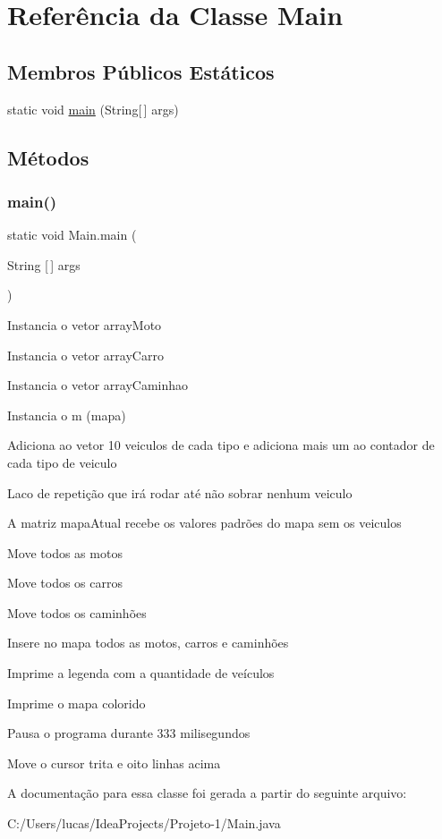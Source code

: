 \hypertarget{class_main}{}\section{Referência da Classe Main}
\label{class_main}
\subsection*{Membros Públicos Estáticos}
\begin{DoxyCompactItemize}
\item 
static void \mbox{\hyperlink{class_main_a8a5d0f827edddff706cc0e6740d0579a}{main}} (String\mbox{[}$\,$\mbox{]} args)
\end{DoxyCompactItemize}


\subsection{Métodos}
\mbox{\label{class_main_a8a5d0f827edddff706cc0e6740d0579a}} 
\subsubsection{\texorpdfstring{main()}{main()}}
{\footnotesize\ttfamily static void Main.\+main (\begin{DoxyParamCaption}\item[{String \mbox{[}$\,$\mbox{]}}]{args }\end{DoxyParamCaption})\hspace{0.3cm}{\ttfamily [static]}}

Instancia o vetor array\+Moto

Instancia o vetor array\+Carro

Instancia o vetor array\+Caminhao

Instancia o m (mapa)

Adiciona ao vetor 10 veiculos de cada tipo e adiciona mais um ao contador de cada tipo de veiculo

Laco de repetição que irá rodar até não sobrar nenhum veiculo

A matriz mapa\+Atual recebe os valores padrões do mapa sem os veiculos

Move todos as motos

Move todos os carros

Move todos os caminhões

Insere no mapa todos as motos, carros e caminhões

Imprime a legenda com a quantidade de veículos

Imprime o mapa colorido

Pausa o programa durante 333 milisegundos

Move o cursor trita e oito linhas acima 

A documentação para essa classe foi gerada a partir do seguinte arquivo\+:\begin{DoxyCompactItemize}
\item 
C\+:/\+Users/lucas/\+Idea\+Projects/\+Projeto-\/1/Main.\+java\end{DoxyCompactItemize}
